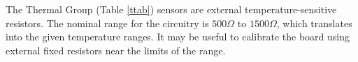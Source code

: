 \documentclass[12pt]{article}
\let\oldsection\section
\renewcommand{\section}{\FloatBarrier\oldsection}
\begin{document}
The Thermal Group (Table \ref{ttab}) sensors are external temperature-sensitive resistors. The nominal range for the circuitry is $500\Omega$ to $1500\Omega$, which translates into the given temperature ranges. It may be useful to calibrate the board using external fixed resistors near the limits of the range.

%
%
% 
%
\end{document}
